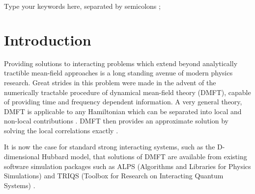 \documentclass[3p,times,procedia]{elsarticle}
\begin{document}
\begin{frontmatter}
\begin{keyword}
Type your keywords here, separated by semicolons ; 




\end{keyword}
\end{frontmatter}




\vspace*{-8pt}

\listoftodos
\section{Introduction}

Providing solutions to interacting problems which extend beyond analytically tractible mean-field approaches is a long standing avenue of modern physics research.  Great strides in this problem were made in the advent of the numerically tractable procedure of dynamical mean-field theory (DMFT), capable of providing time and frequency dependent information.  A very general theory, DMFT is applicable to any Hamiltonian which can be separated into local and non-local contributions \cite{KotliarSavrasov:2006}.  DMFT then provides an approximate solution by solving the local correlations exactly \cite{MetznerVollhardt:1989}.

It is now the case for standard strong interacting systems, such as the D-dimensional Hubbard model, that solutions of DMFT are available from existing software simulation packages such as ALPS (Algorithms and Libraries for Physics Simulations) \cite{ALPS2} and TRIQS (Toolbox for Research on Interacting Quantum Systems) \cite{TRIQS}.
\end{document}
